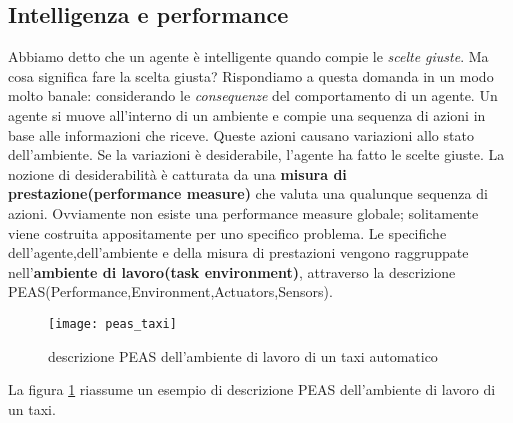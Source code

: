  \subsection{Intelligenza e performance}
 Abbiamo detto che un agente è intelligente quando compie le \emph{scelte giuste}. Ma cosa significa fare la scelta giusta?
 Rispondiamo a questa domanda in un modo molto banale: considerando le \emph{consequenze} del comportamento di un agente.
 Un agente si muove all'interno di un ambiente e compie una sequenza di azioni in base alle informazioni che riceve.
 Queste azioni causano variazioni allo stato dell'ambiente. Se la variazioni è desiderabile, l'agente ha fatto le scelte giuste.
 La nozione di desiderabilità è catturata da una \textbf{misura di prestazione(performance measure)} che valuta una qualunque sequenza di azioni.
 Ovviamente non esiste una performance measure globale; solitamente viene costruita appositamente  per uno specifico problema.
 Le specifiche dell'agente,dell'ambiente e della misura di prestazioni vengono raggruppate nell'\textbf{ambiente di lavoro(task environment)},
 attraverso la descrizione PEAS(Performance,Environment,Actuators,Sensors).
 \begin{figure}
  \texttt{[image: peas\_taxi]}
  \caption{descrizione PEAS dell'ambiente di lavoro di un taxi automatico}
  \label{fig:taxi}
 \end{figure}
 La figura \ref{fig:taxi} riassume un esempio di descrizione PEAS dell'ambiente di lavoro di un taxi.
